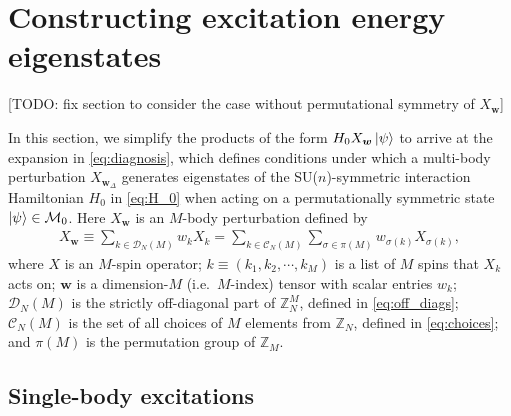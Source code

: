 \documentclass[nofootinbib,notitlepage,11pt]{revtex4-2}
\newcommand{\p}[1]{\left(#1\right)} %
\newcommand{\m}{\bm} %
\newcommand{\1}{\mathds{1}}
\newcommand{\C}{\mathcal{C}}
\newcommand{\D}{\mathcal{D}}
\newcommand{\M}{\mathcal{M}}
\newcommand{\ZZ}{\mathbb{Z}}
\newcommand{\red}[1]{{\color{red} #1}}
\begin{document}
\section{Constructing excitation energy eigenstates}
\label{sec:eigenstates}

\red{[TODO: fix section to consider the case without permutational
  symmetry of $X_{\m w}$]}

In this section, we simplify the products of the form
$H_0X_{\m w}\ket\psi$ to arrive at the expansion in
\eqref{eq:diagnosis}, which defines conditions under which a
multi-body perturbation $X_{\m w_\Delta}$ generates eigenstates of the
SU($n$)-symmetric interaction Hamiltonian $H_0$ in \eqref{eq:H_0} when
acting on a permutationally symmetric state $\ket\psi\in\M_0$.  Here
$X_{\m w}$ is an $M$-body perturbation defined by
\begin{align}
  X_{\m w}
  \equiv \sum_{k\in\D_N\p{M}} w_k X_k
  = \sum_{k\in\C_N\p{M}} \sum_{\sigma\in\pi\p{M}}
  w_{\sigma\p{k}} X_{\sigma\p{k}},
\end{align}
where $X$ is an $M$-spin operator; $k\equiv\p{k_1,k_2,\cdots,k_M}$ is
a list of $M$ spins that $X_k$ acts on; $\m w$ is a dimension-$M$
(i.e.~$M$-index) tensor with scalar entries $w_k$; $\D_N\p{M}$ is the
strictly off-diagonal part of $\ZZ_N^M$, defined in
\eqref{eq:off_diags}; $\C_N\p{M}$ is the set of all choices of $M$
elements from $\ZZ_N$, defined in \eqref{eq:choices}; and $\pi\p{M}$
is the permutation group of $\ZZ_M$.

\subsection{Single-body excitations}
\label{sec:single_body_eigenstates}
\end{document}
